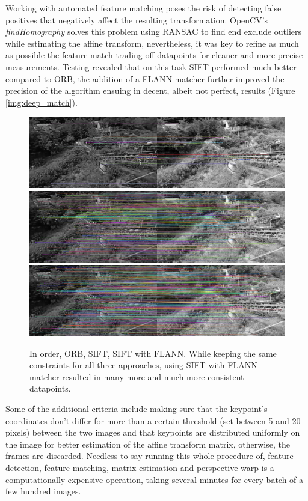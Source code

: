 Working with automated feature matching poses the risk of detecting false positives that negatively affect the resulting transformation. OpenCV's \emph{findHomography} solves this problem using RANSAC to find end exclude outliers while estimating the affine transform, nevertheless, it was key to refine as much as possible the feature match trading off datapoints for cleaner and more precise measurements.
Testing revealed that on this task SIFT performed much better compared to ORB, the addition of a FLANN matcher further improved the precision of the algorithm ensuing in decent, albeit not perfect, results (Figure \ref{img:deep_match}).

\begin{figure}[H]
  \centering
  \includegraphics[width=1\textwidth]{figures/ORB.png}
  \includegraphics[width=1\textwidth]{figures/SIFT.png}
  \includegraphics[width=1\textwidth]{figures/FLANN.png}
  \caption{In order, ORB, SIFT, SIFT with FLANN. While keeping the same constraints for all three approaches, using SIFT with FLANN matcher resulted in many more and much more consistent datapoints.}
  \label{img:orb_sift}
\end{figure}

Some of the additional criteria include making sure that the keypoint's coordinates don't differ for more than a certain threshold (set between 5 and 20 pixels) between the two images and that keypoints are distributed uniformly on the image for better estimation of the affine transform matrix, otherwise, the frames are discarded. Needless to say running this whole procedure of, feature detection, feature matching, matrix estimation and perspective warp is a computationally expensive operation, taking several minutes for every batch of a few hundred images.


